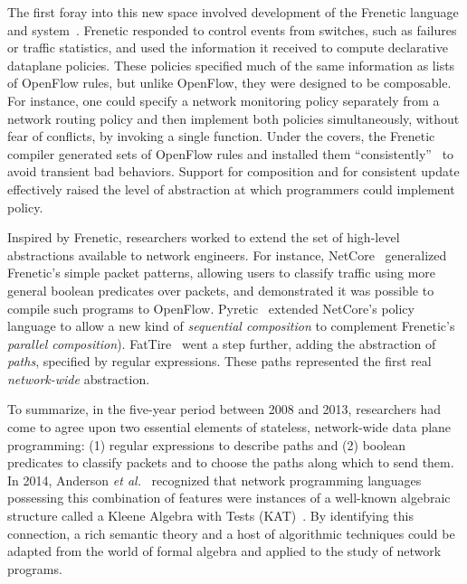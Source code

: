 \documentclass[10pt]{sigalternate052015}
\begin{document}
The first foray into this new space involved development of the
Frenetic language and system~\cite{frenetic}.  Frenetic responded to control
events from switches, such as failures or traffic statistics, and used
the information it received to compute declarative dataplane
policies.  These policies specified much of the same information as
lists of OpenFlow rules, but unlike OpenFlow, they were designed to be composable.  For
instance, one could specify a network monitoring policy separately
from a network routing policy and then implement both policies
simultaneously, without fear of conflicts, by invoking a single
function.  Under the covers, the Frenetic compiler
generated sets of OpenFlow rules and installed them
``consistently''~\cite{consistent-updates} to avoid transient bad
behaviors.  Support for composition and for consistent update
effectively raised the level of abstraction at which
programmers could implement policy.

Inspired by Frenetic, researchers worked to extend the set of
high-level abstractions available to network engineers.  For instance,
NetCore~\cite{netcore} generalized Frenetic's
simple packet patterns, allowing users to classify traffic
using more general boolean predicates over packets, and demonstrated
it was possible to compile
such programs to OpenFlow.
Pyretic~\cite{pyretic} extended NetCore's policy language to allow a
new kind of \emph{sequential composition} to complement Frenetic's
\emph{parallel composition}).  FatTire~\cite{fattire} went a step
further, adding the
abstraction of \emph{paths}, specified by regular expressions.
These paths represented the first real \emph{network-wide}
abstraction.

To summarize, in the five-year period between 2008 and 2013,
researchers had come to agree upon two essential elements of stateless,
network-wide data
plane programming:  (1) regular expressions to describe paths and (2)
boolean predicates to classify packets and to choose the paths along
which to send them.  In 2014, Anderson \emph{et al.}~\cite{netkat}
recognized that network programming languages possessing this
combination of features were instances of a well-known algebraic
structure called a Kleene Algebra with Tests
(KAT)~\cite{kat}.  By identifying this connection, a rich semantic
theory and a host of algorithmic techniques could be adapted from the
world of formal algebra and applied to the study of network programs.
\end{document}
